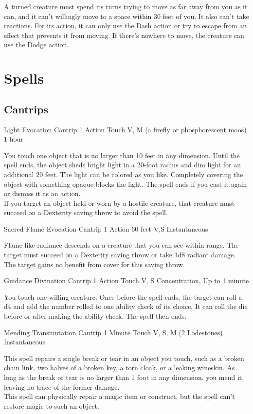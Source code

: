 \documentclass[letterpaper,openany,oneside,twocolumn]{book}
\begin{document}
A turned creature must spend its turns trying to move as far away from you as it can, and it can't willingly move to a space within 30 feet of you. It also can't take reactions. For its action, it can only use the Dash action or try to escape from an effect that prevents it from moving. If there's nowhere to move, the creature can use the Dodge action.

\section*{Spells}
\subsection*{Cantrips}

\DndSpellHeader
  {Light}
  {Evocation Cantrip}
  {1 Action}
  {Touch}
  {V, M (a firefly or phosphorescent moos)}
  {1 hour}

You touch one object that is no larger than 10 feet in any dimension. Until the spell ends, the object sheds bright light in a 20-foot radius and dim light for an additional 20 feet. The light can be colored as you like. Completely covering the object with something opaque blocks the light. The spell ends if you cast it again or dismiss it as an action.\\
If you target an object held or worn by a hostile creature, that creature must succeed on a Dexterity saving throw to avoid the spell.

\DndSpellHeader
  {Sacred Flame}
  {Evocation Cantrip}
  {1 Action}
  {60 feet}
  {V,S}
  {Instantaneous}
  
Flame-like radiance descends on a creature that you can see within range. The target must succeed on a Dexterity saving throw or take 1d8 radiant damage. The target gains no benefit from cover for this saving throw.
  
\DndSpellHeader
  {Guidance}
  {Divination Cantrip}
  {1 Action}
  {Touch}
  {V, S}
  {Concentration, Up to 1 minute}
  
You touch one willing creature. Once before the spell ends, the target can roll a d4 and add the number rolled to one ability check of its choice. It can roll the die before or after making the ability check. The spell then ends.

\DndSpellHeader
  {Mending}
  {Transmutation Cantrip}
  {1 Minute}
  {Touch}
  {V, S, M (2 Lodestones)}
  {Instantaneous}
  
This spell repairs a single break or tear in an object you touch, such as a broken chain link, two halves of a broken key, a torn cloak, or a leaking wineskin. As long as the break or tear is no larger than 1 foot in any dimension, you mend it, leaving no trace of the former damage.\\
This spell can physically repair a magic item or construct, but the spell can't restore magic to such an object.
\end{document}

